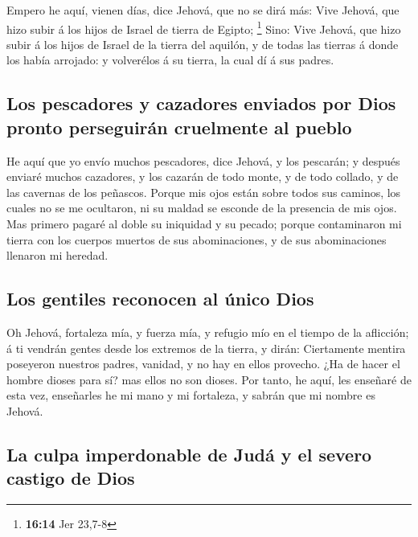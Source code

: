  Empero he aquí, vienen días, dice Jehová, que no se dirá
más: Vive Jehová, que hizo subir á los hijos de Israel de tierra de
Egipto; \footnote{\textbf{16:14} Jer 23,7-8}  Sino: Vive
Jehová, que hizo subir á los hijos de Israel de la tierra del aquilón, y
de todas las tierras á donde los había arrojado: y volverélos á su
tierra, la cual dí á sus padres.

\hypertarget{los-pescadores-y-cazadores-enviados-por-dios-pronto-perseguiruxe1n-cruelmente-al-pueblo}{%
\subsection{Los pescadores y cazadores enviados por Dios pronto
perseguirán cruelmente al
pueblo}\label{los-pescadores-y-cazadores-enviados-por-dios-pronto-perseguiruxe1n-cruelmente-al-pueblo}}

 He aquí que yo envío muchos pescadores, dice Jehová, y los
pescarán; y después enviaré muchos cazadores, y los cazarán de todo
monte, y de todo collado, y de las cavernas de los peñascos.
 Porque mis ojos están sobre todos sus caminos, los cuales
no se me ocultaron, ni su maldad se esconde de la presencia de mis ojos.
 Mas primero pagaré al doble su iniquidad y su pecado;
porque contaminaron mi tierra con los cuerpos muertos de sus
abominaciones, y de sus abominaciones llenaron mi heredad.

\hypertarget{los-gentiles-reconocen-al-uxfanico-dios}{%
\subsection{Los gentiles reconocen al único
Dios}\label{los-gentiles-reconocen-al-uxfanico-dios}}

 Oh Jehová, fortaleza mía, y fuerza mía, y refugio mío en
el tiempo de la aflicción; á ti vendrán gentes desde los extremos de la
tierra, y dirán: Ciertamente mentira poseyeron nuestros padres, vanidad,
y no hay en ellos provecho.  ¿Ha de hacer el hombre dioses
para sí? mas ellos no son dioses.  Por tanto, he aquí, les
enseñaré de esta vez, enseñarles he mi mano y mi fortaleza, y sabrán que
mi nombre es Jehová.

\hypertarget{la-culpa-imperdonable-de-juduxe1-y-el-severo-castigo-de-dios}{%
\subsection{La culpa imperdonable de Judá y el severo castigo de
Dios}\label{la-culpa-imperdonable-de-juduxe1-y-el-severo-castigo-de-dios}}

